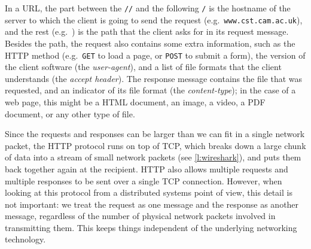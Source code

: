 In a URL, the part between the \verb|//| and the following \verb|/| is the hostname of the server to which the client is going to send the request (e.g.\ \texttt{www.cst.cam.ac.uk}), and the rest (e.g.\ \texttt{\coursepath}) is the path that the client asks for in its request message.
Besides the path, the request also contains some extra information, such as the HTTP method (e.g.\ \texttt{GET} to load a page, or \texttt{POST} to submit a form), the version of the client software (the \emph{user-agent}), and a list of file formats that the client understands (the \emph{accept header}).
The response message contains the file that was requested, and an indicator of its file format (the \emph{content-type}); in the case of a web page, this might be a HTML document, an image, a video, a PDF document, or any other type of file.

Since the requests and responses can be larger than we can fit in a single network packet, the HTTP protocol runs on top of TCP, which breaks down a large chunk of data into a stream of small network packets (see \autoref{l:wireshark}), and puts them back together again at the recipient.
HTTP also allows multiple requests and multiple responses to be sent over a single TCP connection.
However, when looking at this protocol from a distributed systems point of view, this detail is not important: we treat the request as one message and the response as another message, regardless of the number of physical network packets involved in transmitting them.
This keeps things independent of the underlying networking technology.

\begin{frame}[plain]
    \label{s:wireshark}
\end{frame}
\label{l:wireshark}

